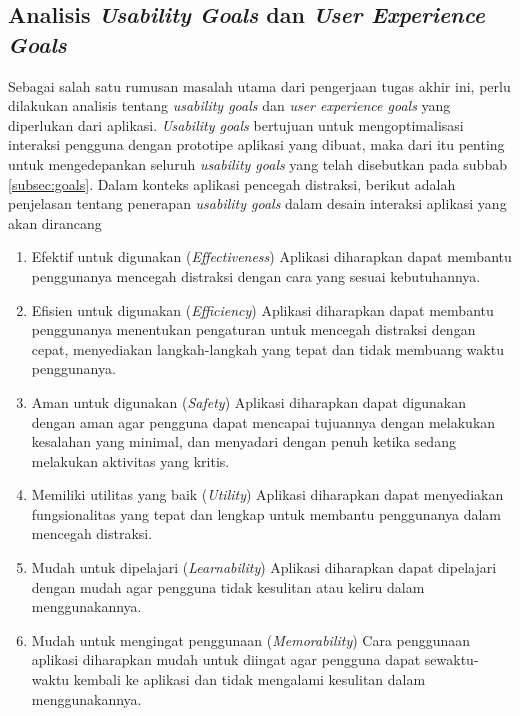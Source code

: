 
\subsection{Analisis \textit{Usability Goals} dan \textit{User Experience Goals}}
\label{subsec:analisis_goals}

Sebagai salah satu rumusan masalah utama dari pengerjaan tugas akhir ini, perlu dilakukan analisis tentang \textit{usability goals} dan \textit{user experience goals} yang diperlukan dari aplikasi. \textit{Usability goals} bertujuan untuk mengoptimalisasi interaksi pengguna dengan prototipe aplikasi yang dibuat, maka dari itu penting untuk mengedepankan seluruh \textit{usability goals} yang telah disebutkan pada subbab \ref{subsec:goals}. Dalam konteks aplikasi pencegah distraksi, berikut adalah penjelasan tentang penerapan \textit{usability goals} dalam desain interaksi aplikasi yang akan dirancang

\begin{enumerate}
  \item Efektif untuk digunakan (\textit{Effectiveness})
  \subitem Aplikasi diharapkan dapat membantu penggunanya mencegah distraksi dengan cara yang sesuai kebutuhannya.
  
  \item Efisien untuk digunakan (\textit{Efficiency})
  \subitem Aplikasi diharapkan dapat membantu penggunanya menentukan pengaturan untuk mencegah distraksi dengan cepat, menyediakan langkah-langkah yang tepat dan tidak membuang waktu penggunanya.
    
  \item Aman untuk digunakan (\textit{Safety})
  \subitem Aplikasi diharapkan dapat digunakan dengan aman agar pengguna dapat mencapai tujuannya dengan melakukan kesalahan yang minimal, dan menyadari dengan penuh ketika sedang melakukan aktivitas yang kritis.
    
  \item Memiliki utilitas yang baik (\textit{Utility})
  \subitem Aplikasi diharapkan dapat menyediakan fungsionalitas yang tepat dan lengkap untuk membantu penggunanya dalam mencegah distraksi.
    
  \item Mudah untuk dipelajari (\textit{Learnability})
  \subitem Aplikasi diharapkan dapat dipelajari dengan mudah agar pengguna tidak kesulitan atau keliru dalam menggunakannya. 
    
  \item Mudah untuk mengingat penggunaan (\textit{Memorability})
  \subitem Cara penggunaan aplikasi diharapkan mudah untuk diingat agar pengguna dapat sewaktu-waktu kembali ke aplikasi dan tidak mengalami kesulitan dalam menggunakannya.  
    
\end{enumerate}

